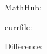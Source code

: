 \documentclass[minimal]{omdoc}
\begin{document}
\makeatletter

MathHub: \MATHHUB

currfile:  \currfileabsdir

Difference: \StrBetween\currfileabsdir{}


\end{document}
